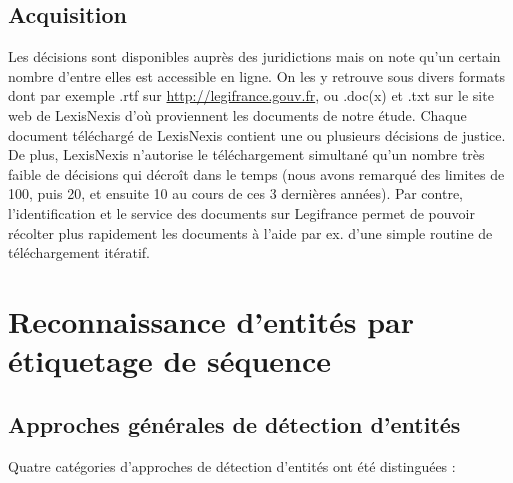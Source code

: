\subsection{Acquisition}
Les décisions sont disponibles auprès des juridictions mais on note qu'un certain nombre d'entre elles est accessible en ligne. On les y retrouve sous divers formats dont par exemple .rtf sur \url{http://legifrance.gouv.fr}, ou .doc(x) et .txt sur le site web de LexisNexis d'où proviennent les documents de notre étude. Chaque document téléchargé de LexisNexis contient une ou plusieurs décisions de justice. De plus, LexisNexis n'autorise le téléchargement simultané qu'un nombre très faible de décisions qui décroît dans le temps (nous avons remarqué des limites de 100, puis 20, et ensuite 10 au cours de ces 3 dernières années). Par contre, l'identification et le service des documents sur Legifrance permet de pouvoir récolter plus rapidement les documents à l'aide par ex. d'une simple routine de téléchargement itératif.




\section{Reconnaissance d'entités par étiquetage de séquence}
\label{sec:structuration:biblio}

\subsection{Approches générales de détection d'entités}

Quatre catégories d'approches de détection d'entités ont été distinguées \citep{chau2002nerwithNN}:

